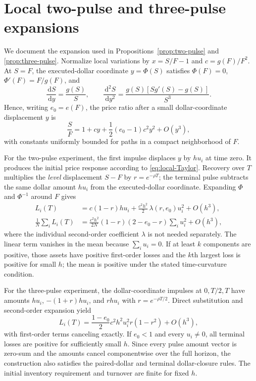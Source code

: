 \documentclass[11pt]{article}
\numberwithin{equation}{section}
\theoremstyle{definition}
\theoremstyle{remark}
\newcommand{\dd}{\,\mathrm{d}}
\begin{document}
\section{Local two-pulse and three-pulse expansions}\label{app:local}
We document the expansion used in Propositions~\ref{prop:two-pulse} and \ref{prop:three-pulse}. Normalize local variations by $x=S/F-1$ and $c=g(F)/F^2$. At $S=F$, the executed-dollar coordinate $y=\Phi(S)$ satisfies $\Phi(F)=0$, $\Phi'(F)=F/g(F)$, and
\begin{equation}\label{eq:local-inverse}
\frac{\dd S}{\dd y}=\frac{g(S)}S,
\qquad
\frac{\dd^2 S}{\dd y^2}=
\frac{g(S)[Sg'(S)-g(S)]}{S^3}.
\end{equation}
Hence, writing $e_0=e(F)$, the price ratio after a small dollar-coordinate displacement $y$ is
\begin{equation}\label{eq:local-Taylor}
\frac SF=1+cy+\frac12(e_0-1)c^2y^2+O(y^3),
\end{equation}
with constants uniformly bounded for paths in a compact neighborhood of $F$.

For the two-pulse experiment, the first impulse displaces $y$ by $hu_i$ at time zero. It produces the initial price response according to \eqref{eq:local-Taylor}. Recovery over $T$ multiplies the \emph{level} displacement $S-F$ by $r=e^{-\rho T}$; the terminal pulse subtracts the same dollar amount $hu_i$ from the executed-dollar coordinate. Expanding $\Phi$ and $\Phi^{-1}$ around $F$ gives
\begin{align}\label{eq:local-two}
L_i(T)&=c(1-r)hu_i+\frac{c^2h^2}{2}\,\lambda(r,e_0)u_i^2+O(h^3),\\
\frac1N\sum_i L_i(T)&=\frac{c^2h^2}{2N}(1-r)(2-e_0-r)\sum_i u_i^2+O(h^3),\nonumber
\end{align}
where the individual second-order coefficient $\lambda$ is not needed separately. The linear term vanishes in the mean because $\sum_i u_i=0$. If at least $k$ components are positive, those assets have positive first-order losses and the $k$th largest loss is positive for small $h$; the mean is positive under the stated time-curvature condition.

For the three-pulse experiment, the dollar-coordinate impulses at $0,T/2,T$ have amounts $hu_i$, $-(1+r)hu_i$, and $rhu_i$ with $r=e^{-\rho T/2}$. Direct substitution and second-order expansion yield
\begin{equation}\label{eq:local-three}
L_i(T)=\frac{1-e_0}{2}c^2h^2u_i^2r(1-r^2)+O(h^3),
\end{equation}
with first-order terms canceling exactly. If $e_0<1$ and every $u_i\ne0$, all terminal losses are positive for sufficiently small $h$. Since every pulse amount vector is zero-sum and the amounts cancel componentwise over the full horizon, the construction also satisfies the paired-dollar and terminal dollar-closure rules. The initial inventory requirement and turnover are finite for fixed $h$.
\end{document}
